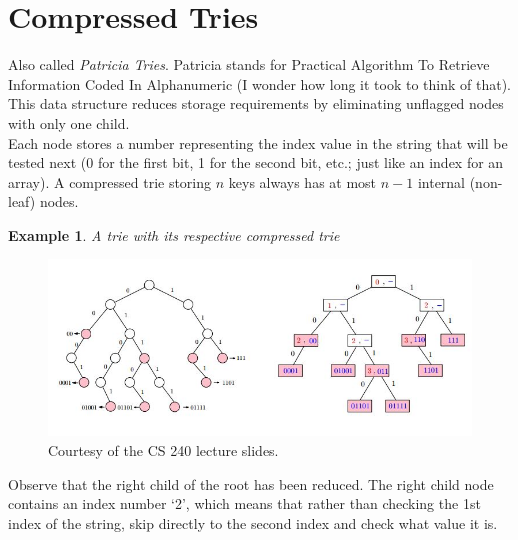 \documentclass{report}
\newtheorem{ex}{Example}[section]
\begin{document}
\section{Compressed Tries}
Also called \textit{Patricia Tries}. Patricia stands for Practical Algorithm To Retrieve Information Coded In Alphanumeric (I wonder how long it took to think of that). This data structure reduces storage requirements by eliminating unflagged nodes with only one child.\\Each node stores a number representing the index value in the string that will be tested next (0 for the first bit, 1 for the second bit, etc.; just like an index for an array). A compressed trie storing $n$ keys always has at most $n-1$ internal (non-leaf) nodes. \newline
\begin{ex}
A trie with its respective compressed trie
\end{ex}
\begin{figure}[ht]
\begin{center}
\includegraphics[scale=0.8]{trie2.jpg}
\end{center}
\caption{Courtesy of the CS 240 lecture slides.}
\end{figure}
\noindent Observe that the right child of the root has been reduced. The right child node contains an index number `2', which means that rather than checking the 1st index of the string,  skip directly to the second index and check what value it is.
\end{document}
